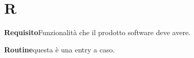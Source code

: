 \newpage
\section{R}\label{l:R}
\textbf{Requisito}\newline Funzionalità che il prodotto software deve avere.

\textbf{Routine}\newline questa è una entry a caso.\\\\